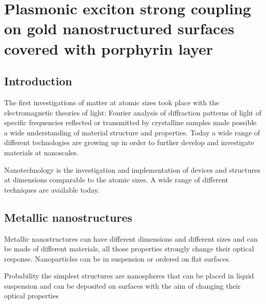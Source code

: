 
\chapter{Plasmonic exciton strong coupling on gold nanostructured surfaces covered with porphyrin layer} %

\label{Chapter1} %


\newcommand{\keyword}[1]{\textbf{#1}}
\newcommand{\tabhead}[1]{\textbf{#1}}
\newcommand{\code}[1]{\texttt{#1}}
\newcommand{\file}[1]{\texttt{\bfseries#1}}
\newcommand{\option}[1]{\texttt{\itshape#1}}



\section{Introduction}

The first investigations of matter at atomic sizes took place with the electromagnetic theories of light: Fourier analysis of diffraction patterns of light of specific frequencies reflected or transmitted by crystalline samples made possible a wide understanding of material structure and properties.
Today a wide range of different technologies are growing up in order to further develop and investigate materials at nanoscales.

Nanotechnology is the investigation and implementation of devices and structures at dimensions comparable to the atomic sizes.%
A wide range of different techniques are available today.



\section{Metallic nanostructures}

Metallic nanostructures can have different dimensions and different sizes and can be made of different materials, all those properties strongly change their optical response. Nanoparticles can be in suspension or ordered on flat surfaces.

 Probability the simplest structures are nanospheres that can be placed in liquid suspension and can be deposited on surfaces with the aim of changing their optical properties



